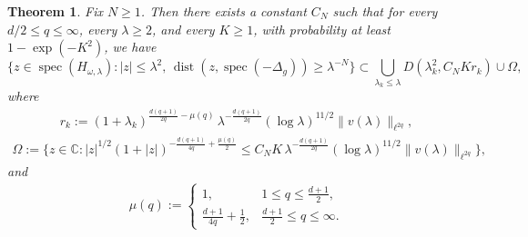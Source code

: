 \documentclass[12pt,reqno]{amsart}
\newtheorem{theorem}{Theorem}[section]
\theoremstyle{definition}
\theoremstyle{remark}
\numberwithin{equation}{section}
\newcommand{\1}{\mathbbm{1}}
\newcommand{\C}{\mathbb{C}}
\DeclareMathOperator{\dist}{dist}
\DeclareMathOperator{\spec}{spec}
\begin{document}
\begin{theorem}\label{thm:main_intro}
Fix \(N\geq 1\). Then there exists a constant \(C_N\) such that for every $d/2\leq q\leq\infty$, every $\lambda\geq 2$, and every \(K\geq 1\), with probability at least \(1-\exp(-K^2)\), 
we have
\[
\{z\in\spec(H_{\omega,\lambda}) : |z|\leq \lambda^2,\,\dist(z, \spec(-\Delta_g))\geq \lambda^{-N}\}
\subset
\bigcup_{\lambda_k\leq \lambda} D(\lambda_k^2,C_NKr_k)\cup \Omega,
\]
where 
\begin{align}\label{def.r_k}
r_k
:=
(1+\lambda_k)^{\frac{d(q+1)}{2q}-\mu(q)}  \, \lambda^{-\frac{d(q+1)}{2q}} (\log\lambda)^{11/2}\|v(\lambda)\|_{\ell^{2q}},
\end{align}
\begin{align}
\Omega:=\{z\in\C: |z|^{1/2}(1+|z|)^{-\frac{d(q+1)}{4q}+\frac{\mu(q)}{2}}  \leq C_NK\, \lambda^{-\frac{d(q+1)}{2q}} (\log \lambda)^{11/2} \|v(\lambda)\|_{\ell^{2q}}\},
\end{align}
and  
\begin{align}\label{def.mu(q)}
      \mu(q):=\begin{cases}
1, & 1\leq q\leq \frac{d+1}{2},\\
\frac{d+1}{4q}+\frac{1}{2}, & \frac{d+1}{2}\leq q\leq\infty.
\end{cases}
  \end{align}
\end{theorem}



\end{document}
